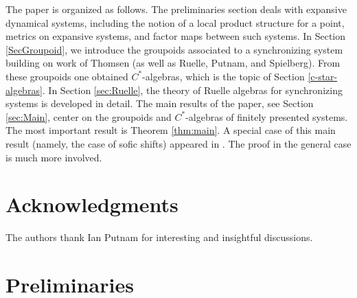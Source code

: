 \documentclass{amsart}
\theoremstyle{plain}
\theoremstyle{definition}
\theoremstyle{remark}
\begin{document}
The paper is organized as follows. The preliminaries section deals with expansive dynamical systems, including the notion of a local product structure for a point, metrics on expansive systems, and factor maps between such systems. In Section \ref{SecGroupoid}, we introduce the groupoids associated to a synchronizing system building on work of Thomsen (as well as Ruelle, Putnam, and Spielberg). From these groupoids one obtained $C^*$-algebras, which is the topic of Section \ref{c-star-algebras}. In Section \ref{sec:Ruelle}, the theory of Ruelle algebras for synchronizing systems is developed in detail. The main results of the paper, see Section \ref{sec:Main}, center on the groupoids and $C^*$-algebras of finitely presented systems. The most important result is Theorem \ref{thm:main}. A special case of this main result (namely, the case of sofic shifts) appeared in \cite{DeeStoShift}. The proof in the general case is much more involved. 

\section*{Acknowledgments}

The authors thank Ian Putnam for interesting and insightful discussions. 


\section{Preliminaries}
\end{document}
